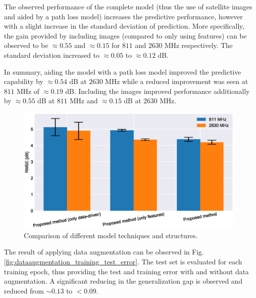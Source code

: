 The observed performance of the complete model (thus the use of satellite images and aided by a path loss model) increases the predictive performance, however with a slight increase in the standard deviation of prediction. More specifically, the gain provided by including images (compared to only using features) can be observed to be $\approx 0.55$ and $\approx 0.15$ for $811$ and $2630$ MHz respectively. The standard deviation increased to $\approx 0.05$ to $\approx 0.12$ dB. 

In summary, aiding the model with a path loss model improved the predictive capability by $\approx 0.54$ dB at $2630$ MHz while a reduced improvement was seen at $811$ MHz of $\approx 0.19$ dB. Including the images improved performance additionally by $\approx 0.55$ dB at $811$ MHz and $\approx 0.15$ dB at $2630$ MHz.

\begin{figure}
    \centering
    \includegraphics{chapters/part_pathloss/model_aided_paper/trainedmodels_barplot.eps}
    \caption{Comparison of different model techniques and structures.}
    \label{fig:train_models_barplot}
\end{figure}

The result of applying data augmentation can be observed in Fig. \ref{fig:dataaugmentation_training_test_error}. The test set is evaluated for each training epoch, thus providing the test and training error with and without data augmentation. A significant reducing in the generalization gap is observed and reduced from $\sim 0.13$ to $< 0.09$. 

